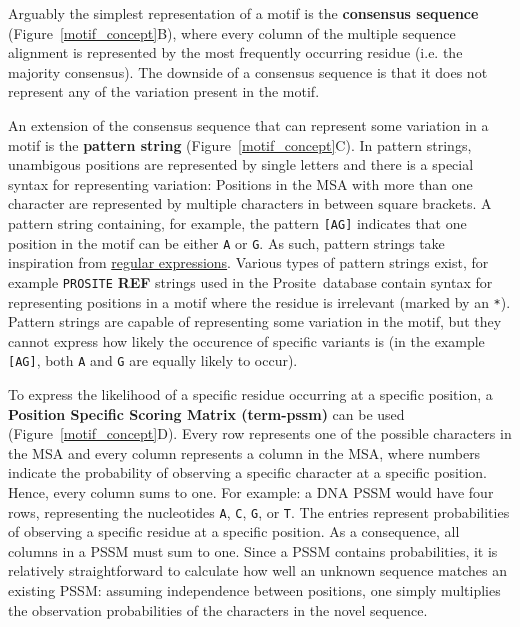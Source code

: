 Arguably the simplest representation of a motif is the \textbf{consensus sequence} (Figure~\ref{motif_concept}B), where every column of the multiple sequence alignment is represented by the most frequently occurring residue (i.e. the majority consensus). The downside of a consensus sequence is that it does not represent any of the variation present in the motif.

An extension of the consensus sequence that can represent some variation in a motif is the \textbf{pattern string} (Figure~\ref{motif_concept}C).
In pattern strings, unambigous positions are represented by single letters and there is a special syntax for representing variation:
Positions in the MSA with more than one character are represented by multiple characters in between square brackets.
A pattern string containing, for example, the pattern \texttt{[AG]} indicates that one position in the motif can be either \texttt{A} or \texttt{G}. As such, pattern strings take inspiration from \href{https://en.wikipedia.org/wiki/Regular\_expression}{regular expressions}. Various types of pattern strings exist, for example \texttt{PROSITE} \textbf{REF} strings used in the Prosite~database contain syntax for representing positions in a motif where the residue is irrelevant (marked by an \texttt{*}). Pattern strings are capable of representing some variation in the motif, but they cannot express how likely the occurence of specific variants is (in the example \texttt{[AG]}, both \texttt{A} and \texttt{G} are equally likely to occur).

To express the likelihood of a specific residue occurring at a specific position, a \textbf{Position Specific Scoring Matrix (\gls{term-pssm})} can be used (Figure~\ref{motif_concept}D).
Every row represents one of the possible characters in the MSA and every column represents a column in the MSA, where numbers indicate the probability of observing a specific character at a specific position.
Hence, every column sums to one.
For example: a DNA PSSM would have four rows, representing the nucleotides \texttt{A}, \texttt{C}, \texttt{G}, or \texttt{T}. The entries represent probabilities of observing a specific residue at a specific position. As a consequence, all columns in a PSSM must sum to one. Since a PSSM contains probabilities, it is relatively straightforward to calculate how well an unknown sequence matches an existing PSSM: assuming independence between positions, one simply multiplies the observation probabilities of the characters in the novel sequence.

